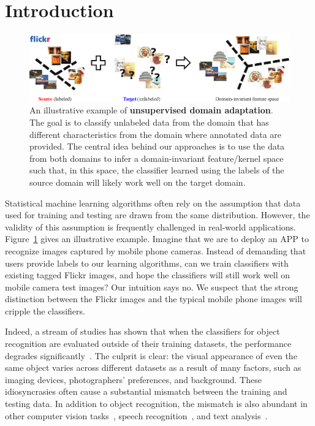 

\section{Introduction}
\begin{figure}[t]
\centering
\includegraphics[width=0.92\columnwidth]{fig/fImageConcept_3.eps}
\caption{An illustrative example of {\bf unsupervised domain adaptation}. The goal is to classify unlabeled data from the  domain that has different characteristics from the  domain where annotated data are provided. The central idea behind our approaches is to use the data from both domains to infer a domain-invariant feature/kernel space such that, in this space, the classifier learned using the labels of the source domain will likely work well on the target domain.}
\label{fConceptUDA}
\end{figure}

Statistical machine learning algorithms often rely on the assumption that data used for training and testing are drawn from the same distribution. However, the validity of this assumption is frequently challenged in real-world applications. Figure~\ref{fConceptUDA} gives an illustrative example. Imagine that we are to deploy an APP to recognize images captured by mobile phone cameras. Instead of demanding that users provide labels to our learning algorithms, can we train classifiers with existing tagged Flickr images, and hope the classifiers will still work well on mobile camera test images? Our intuition says no. We suspect that the strong distinction between the Flickr images and the typical mobile phone images will cripple the classifiers.

Indeed, a stream of studies has shown that when the classifiers for object recognition are evaluated outside of their training datasets, the performance degrades significantly~\cite{TorralbaCVPR11Unbiased,DollarCVPR09Pedestrian,PerronninCVPR10Largescale}.  The culprit is clear: the visual appearance  of even the same object varies across different datasets as a result of many factors, such as imaging devices, photographers' preferences, and background. These idiosyncrasies often cause a substantial mismatch between the training and testing data. In addition to object recognition, the mismatch is also abundant in other computer vision tasks~\cite{DuanCVPR09Domain,WangCVPR2011automatic,JainCVPR10online,DuanPAMI12Visual}, speech recognition~\cite{LeggetterCSL95Maximum}, and text analysis~\cite{BlitzerACL07domain,BlitzerEMNLP06Domain}. 






